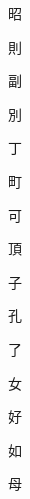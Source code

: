 \begin{spacing}{2.5}
{\Huge \begin{CJK}{UTF8}{min} 昭\end{CJK}}\hspace{0.1cm}
{\Huge \begin{CJK}{UTF8}{min} 則\end{CJK}}\hspace{0.1cm}
{\Huge \begin{CJK}{UTF8}{min} 副\end{CJK}}\hspace{0.1cm}
{\Huge \begin{CJK}{UTF8}{min} 別\end{CJK}}\hspace{0.1cm}
{\Huge \begin{CJK}{UTF8}{min} 丁\end{CJK}}\hspace{0.1cm}
{\Huge \begin{CJK}{UTF8}{min} 町\end{CJK}}\hspace{0.1cm}
{\Huge \begin{CJK}{UTF8}{min} 可\end{CJK}}\hspace{0.1cm}
{\Huge \begin{CJK}{UTF8}{min} 頂\end{CJK}}\hspace{0.1cm}
{\Huge \begin{CJK}{UTF8}{min} 子\end{CJK}}\hspace{0.1cm}
{\Huge \begin{CJK}{UTF8}{min} 孔\end{CJK}}\hspace{0.1cm}
{\Huge \begin{CJK}{UTF8}{min} 了\end{CJK}}\hspace{0.1cm}
{\Huge \begin{CJK}{UTF8}{min} 女\end{CJK}}\hspace{0.1cm}
{\Huge \begin{CJK}{UTF8}{min} 好\end{CJK}}\hspace{0.1cm}
{\Huge \begin{CJK}{UTF8}{min} 如\end{CJK}}\hspace{0.1cm}
{\Huge \begin{CJK}{UTF8}{min} 母\end{CJK}}\hspace{0.1cm}

\end{spacing}
